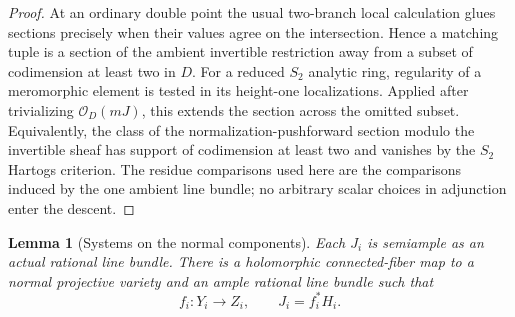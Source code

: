\documentclass[11pt,letterpaper]{article}
\newcommand{\OO}{\mathcal{O}}
\newtheorem{lemma}[theorem]{Lemma}
\theoremstyle{definition}
\theoremstyle{remark}
\begin{document}
\begin{proof}
At an ordinary double point the usual two-branch local calculation
glues sections precisely when their values agree on the intersection.
Hence a matching tuple is a section of the ambient invertible
restriction away from a subset of codimension at least two in $D$.
For a reduced $S_2$ analytic ring, regularity of a meromorphic element
is tested in its height-one localizations.  Applied after trivializing
$\OO_D(mJ)$, this extends the section across the omitted subset.
Equivalently, the class of the normalization-pushforward section
modulo the invertible sheaf has support of codimension at least two
and vanishes by the $S_2$ Hartogs criterion.  The residue comparisons
used here are the comparisons induced by the one ambient line bundle;
no arbitrary scalar choices in adjunction enter the descent.
\end{proof}

\begin{lemma}[Systems on the normal components]
\label{floor:component-systems}
Each $J_i$ is semiample as an actual rational line bundle.  There is a
holomorphic connected-fiber map to a normal projective variety and an
ample rational line bundle such that
\begin{equation}
 \label{floor:stein-system}
 f_i:Y_i\longrightarrow Z_i,\qquad J_i=f_i^*H_i.
\end{equation}
\end{lemma}
\end{document}
